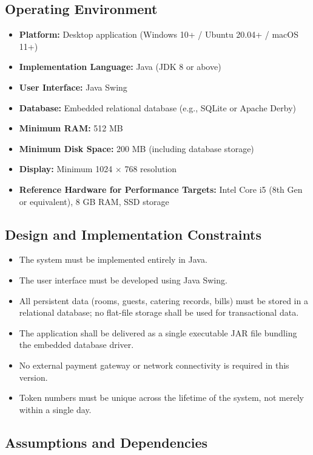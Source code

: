 \documentclass[12pt,a4paper]{article}
\begin{document}
\subsection{Operating Environment}

\begin{itemize}[leftmargin=1.5em]
  \item \textbf{Platform:} Desktop application (Windows 10+ / Ubuntu 20.04+ / macOS 11+)
  \item \textbf{Implementation Language:} Java (JDK 8 or above)
  \item \textbf{User Interface:} Java Swing
  \item \textbf{Database:} Embedded relational database (e.g., SQLite or Apache Derby)
  \item \textbf{Minimum RAM:} 512 MB
  \item \textbf{Minimum Disk Space:} 200 MB (including database storage)
  \item \textbf{Display:} Minimum 1024 $\times$ 768 resolution
  \item \textbf{Reference Hardware for Performance Targets:} Intel Core i5 (8th Gen or equivalent), 8 GB RAM, SSD storage
\end{itemize}

\subsection{Design and Implementation Constraints}

\begin{itemize}[leftmargin=1.5em]
  \item The system must be implemented entirely in Java.
  \item The user interface must be developed using Java Swing.
  \item All persistent data (rooms, guests, catering records, bills) must be stored in a
        relational database; no flat-file storage shall be used for transactional data.
  \item The application shall be delivered as a single executable JAR file bundling the
        embedded database driver.
  \item No external payment gateway or network connectivity is required in this version.
  \item Token numbers must be unique across the lifetime of the system, not merely within
        a single day.
\end{itemize}

\subsection{Assumptions and Dependencies}
\end{document}

